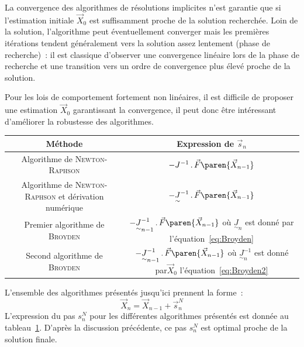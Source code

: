 \documentclass[12pt]{article}
\begin{document}
La convergence des algorithmes de résolutions implicites n'est garantie
que si l'estimation initiale \(\vec{X}_{0}\) est suffisamment proche de
la solution recherchée. Loin de la solution, l'algorithme peut
éventuellement converger mais les premières itérations tendent
généralement vers la solution assez lentement (phase de recherche)~: il
est classique d'observer une convergence linéaire lors de la phase de
recherche et une transition vers un ordre de convergence plus élevé
proche de la solution.

Pour les lois de comportement fortement non linéaires, il est difficile
de proposer une estimation \(\vec{X}_{0}\) garantissant la convergence,
il peut donc être intéressant d'améliorer la robustesse des algorithmes.

\begin{table}
  \centering
  \begin{tabular}{|c|c|}
    \hline
    Méthode & Expression de \(\vec{s}_{n}\) \\
    \hline
    \hline
    Algorithme de \textsc{Newton-Raphson}
    & \(-J^{-1}\,.\,\vec{F}\paren{\vec{X}_{n-1}}\) \\
    \hline
    \begin{minipage}{7cm}
      Algorithme de \textsc{Newton-Raphson} et dérivation numérique
    \end{minipage} &
    \(-\underset{\sim}{J}^{-1}\,.\,\vec{F}\paren{\vec{X}_{n-1}}\) \\
    \hline
    Premier algorithme de \textsc{Broyden} &
    \begin{minipage}{5cm}
      \(-\underset{\sim}{J}_{n-1}^{-1}\,.\,\vec{F}\paren{\vec{X}_{n-1}}\)
      où \(\underset{\sim}{J}_{n}\) est donné par
      l'équation~\eqref{eq:Broyden}
    \end{minipage} \\
    \hline
    Second algorithme de \textsc{Broyden} &
    \begin{minipage}{5cm}
      \(-\underset{\sim}{J}_{n-1}^{-1}\,.\,\vec{F}\paren{\vec{X}_{n-1}}\)
      où \(\underset{\sim}{J}_{n}^{-1}\) est donné par\(\vec{X}_{0}\)
      l'équation~\eqref{eq:Broyden2}
    \end{minipage} \\
    \hline
  \end{tabular}
  \label{tab:sn}
\end{table}

L'ensemble des algorithmes présentés jusqu'ici prennent la forme~:
\[
\vec{X}_{n}=\vec{X}_{n-1}+\vec{s}^{N}_{n}
\]
L'expression du pas \(s^{N}_{n}\) pour les différentes algorithmes
présentés est donnée au tableau~\ref{tab:sn}. D'après la discussion
précédente, ce pas \(s^{N}_{n}\) est optimal proche de la solution
finale.
\end{document}
